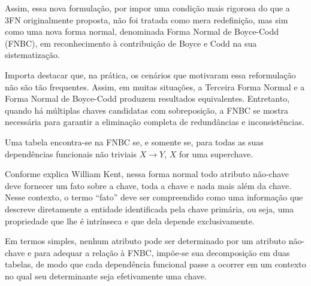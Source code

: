 Assim, essa nova formulação, por impor uma condição mais rigorosa do que a 3FN originalmente proposta, não foi tratada como mera redefinição, mas sim como uma nova forma normal, denominada Forma Normal de Boyce-Codd (FNBC), em reconhecimento à contribuição de Boyce e Codd na sua sistematização.

Importa destacar que, na prática, os cenários que motivaram essa reformulação não são tão frequentes. Assim, em muitas situações, a Terceira Forma Normal e a Forma Normal de Boyce-Codd produzem resultados equivalentes. Entretanto, quando há múltiplas chaves candidatas com sobreposição, a FNBC se mostra necessária para garantir a eliminação completa de redundâncias e inconsistências.

Uma tabela encontra-se na FNBC se, e somente se, para todas as suas dependências funcionais não triviais $X \rightarrow Y$, $X$ for uma superchave.\cite{ramakrishnan2011} 

Conforme explica William Kent\cite{kent1983simple}, nessa forma normal todo atributo não-chave deve fornecer um fato sobre a chave, toda a chave e nada mais além da chave. Nesse contexto, o termo “fato” deve ser compreendido como uma informação que descreve diretamente a entidade identificada pela chave primária, ou seja, uma propriedade que lhe é intrínseca e que dela depende exclusivamente. 

Em termos simples, nenhum atributo pode ser determinado por um atributo não-chave e para adequar a relação à FNBC, impõe-se sua decomposição em duas tabelas, de modo que cada dependência funcional passe a ocorrer em um contexto no qual seu determinante seja efetivamente uma chave.

